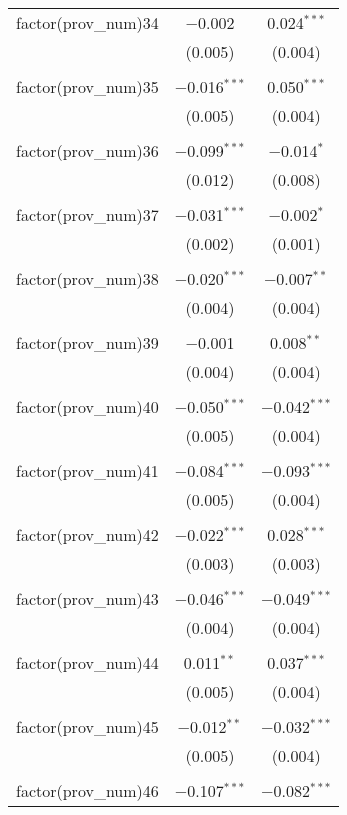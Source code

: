 \begin{table}[!htbp]
\begin{tabular}{@{\extracolsep{5pt}}lcc}
 factor(prov\_num)34 & $-$0.002 & 0.024$^{***}$ \\ 
  & (0.005) & (0.004) \\ 
  & & \\ 
 factor(prov\_num)35 & $-$0.016$^{***}$ & 0.050$^{***}$ \\ 
  & (0.005) & (0.004) \\ 
  & & \\ 
 factor(prov\_num)36 & $-$0.099$^{***}$ & $-$0.014$^{*}$ \\ 
  & (0.012) & (0.008) \\ 
  & & \\ 
 factor(prov\_num)37 & $-$0.031$^{***}$ & $-$0.002$^{*}$ \\ 
  & (0.002) & (0.001) \\ 
  & & \\ 
 factor(prov\_num)38 & $-$0.020$^{***}$ & $-$0.007$^{**}$ \\ 
  & (0.004) & (0.004) \\ 
  & & \\ 
 factor(prov\_num)39 & $-$0.001 & 0.008$^{**}$ \\ 
  & (0.004) & (0.004) \\ 
  & & \\ 
 factor(prov\_num)40 & $-$0.050$^{***}$ & $-$0.042$^{***}$ \\ 
  & (0.005) & (0.004) \\ 
  & & \\ 
 factor(prov\_num)41 & $-$0.084$^{***}$ & $-$0.093$^{***}$ \\ 
  & (0.005) & (0.004) \\ 
  & & \\ 
 factor(prov\_num)42 & $-$0.022$^{***}$ & 0.028$^{***}$ \\ 
  & (0.003) & (0.003) \\ 
  & & \\ 
 factor(prov\_num)43 & $-$0.046$^{***}$ & $-$0.049$^{***}$ \\ 
  & (0.004) & (0.004) \\ 
  & & \\ 
 factor(prov\_num)44 & 0.011$^{**}$ & 0.037$^{***}$ \\ 
  & (0.005) & (0.004) \\ 
  & & \\ 
 factor(prov\_num)45 & $-$0.012$^{**}$ & $-$0.032$^{***}$ \\ 
  & (0.005) & (0.004) \\ 
  & & \\ 
 factor(prov\_num)46 & $-$0.107$^{***}$ & $-$0.082$^{***}$ \\ 

\end{tabular}
\end{table}
